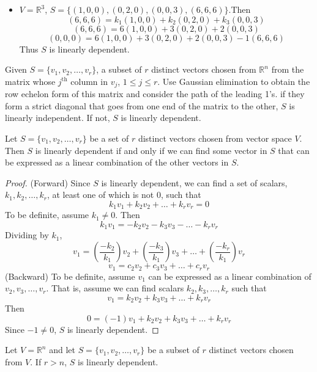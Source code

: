 \documentclass[12pt]{article}
\begin{document}
\begin{example}
\begin{itemize}
\item $V = \mathbb{R}^3$, $S = \{(1, 0, 0), (0, 2, 0), (0, 0, 3), (6, 6, 6)\}$.Then $$ (6, 6, 6) = k_1(1, 0, 0) + k_2(0, 2, 0) + k_3(0, 0, 3) $$ $$(6, 6, 6) = 6(1, 0, 0) + 3(0, 2, 0) + 2(0, 0, 3) $$ $$ (0, 0, 0) = 6(1, 0, 0) + 3(0, 2, 0) + 2(0, 0, 3) - 1(6, 6, 6) $$ Thus $S$ is linearly dependent. \end{itemize} \end{example} 
Given $S = \{v_1, v_2, \dots, v_r\}$, a subset of $r$ distinct vectors chosen from $\mathbb{R}^n$ from the matrix whose $j^\text{th}$ column in $v_j$, $1 \leq j \leq r$. Use Gaussian elimination to obtain the row echelon form of this matrix and consider the path of the leading 1's. if they form a strict diagonal that goes from one end of the matrix to the other, $S$ is linearly independent. If not, $S$ is linearly dependent. 
\begin{theorem} Let $S = \{v_1, v_2, \dots, v_r\}$ be a set of $r$ distinct vectors chosen from vector space $V$. Then $S$ is linearly dependent if and only if we can find some vector in $S$ that can be expressed as a linear combination of the other vectors in $S$. \end{theorem} \begin{proof} 
(Forward) Since $S$ is linearly dependent, we can find a set of scalars, $k_1, k_2, \dots, k_r$, at least one of which is not 0, such that $$k_1v_1 + k_2v_2 + \dots + k_rv_r = 0$$ To be definite, assume $k_1 \neq 0$. Then $$ k_1v_1 = -k_2v_2 - k_3v_3 - \dots - k_rv_r$$ Dividing by $k_1$, $$ v_1 = (\frac{-k_2}{k_1})v_2 + (\frac{-k_3}{k_1})v_3 + \dots + (\frac{-k_r}{k_1})v_r $$ $$ v_1 = c_2v_2 + c_3v_3 + \dots + c_rv_r$$ \newline 
(Backward) To be definite, assume $v_1$ can be expressed as a linear combination of $v_2, v_3, \dots, v_r$. That is, assume we can find scalars $k_2, k_3, \dots, k_r$ such that $$v_1 = k_2v_2 + k_3v_3 + \dots + k_rv_r $$ Then $$ 0 = (-1)v_1 +k_2v_2 + k_3v_3 + \dots + k_rv_r$$ Since $-1 \neq 0$, $S$ is linearly dependent. \end{proof} 
\begin{theorem} Let $V = \mathbb{R}^n$ and let $S = \{v_1, v_2, \dots, v_r\}$ be a subset of $r$ distinct vectors chosen from $V$. If $r > n$, $S$ is linearly dependent. \end{theorem} 
\end{document}
